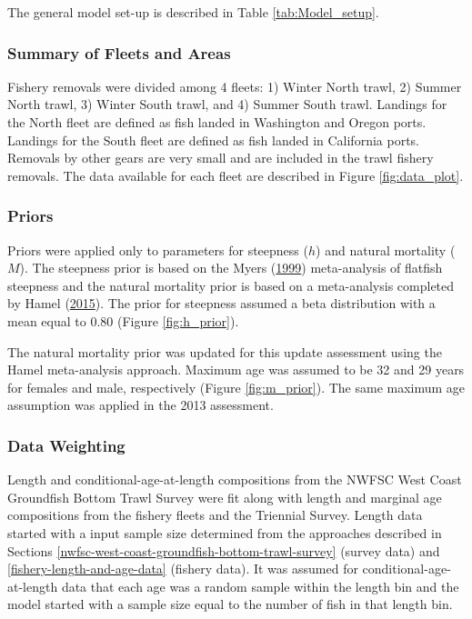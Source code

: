 \documentclass[12pt,]{article}
\begin{document}
The general model set-up is described in Table \ref{tab:Model_setup}.

\subsubsection{Summary of Fleets and
Areas}\label{summary-of-fleets-and-areas}

Fishery removals were divided among 4 fleets: 1) Winter North trawl, 2)
Summer North trawl, 3) Winter South trawl, and 4) Summer South trawl.
Landings for the North fleet are defined as fish landed in Washington
and Oregon ports. Landings for the South fleet are defined as fish
landed in California ports. Removals by other gears are very small and
are included in the trawl fishery removals. The data available for each
fleet are described in Figure \ref{fig:data_plot}.

\subsubsection{Priors}\label{priors}

Priors were applied only to parameters for steepness (\(h\)) and natural
mortality (\(M\)). The steepness prior is based on the Myers
(\protect\hyperlink{ref-myers_maximum_1999}{1999}) meta-analysis of
flatfish steepness and the natural mortality prior is based on a
meta-analysis completed by Hamel
(\protect\hyperlink{ref-hamel_method_2015}{2015}). The prior for
steepness assumed a beta distribution with a mean equal to 0.80 (Figure
\ref{fig:h_prior}).

The natural mortality prior was updated for this update assessment using
the Hamel meta-analysis approach. Maximum age was assumed to be 32 and
29 years for females and male, respectively (Figure \ref{fig:m_prior}).
The same maximum age assumption was applied in the 2013 assessment.

\subsubsection{Data Weighting}\label{data-weighting}

Length and conditional-age-at-length compositions from the NWFSC West
Coast Groundfish Bottom Trawl Survey were fit along with length and
marginal age compositions from the fishery fleets and the Triennial
Survey. Length data started with a input sample size determined from the
approaches described in Sections
\ref{nwfsc-west-coast-groundfish-bottom-trawl-survey} (survey data) and
\ref{fishery-length-and-age-data} (fishery data). It was assumed for
conditional-age-at-length data that each age was a random sample within
the length bin and the model started with a sample size equal to the
number of fish in that length bin.
\end{document}
